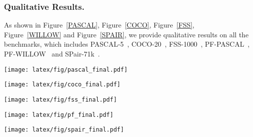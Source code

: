 \subsubsection{Qualitative Results.}
As shown in Figure~\ref{PASCAL}, Figure~\ref{COCO}, Figure~\ref{FSS}, Figure~\ref{WILLOW} and Figure~\ref{SPAIR}, we provide qualitative results on all the benchmarks, which includes PASCAL-5~\cite{shaban2017one}, COCO-20~\cite{lin2014microsoft}, FSS-1000~\cite{li2020fss}, PF-PASCAL~\cite{ham2017proposal}, PF-WILLOW~\cite{ham2016proposal} and SPair-71k~\cite{min2019spair}.
\newpage



\clearpage



\begin{figure*}[t]
\centering
\texttt{[image: latex/fig/pascal\_final.pdf]}\vspace{-10pt}
\caption{\textbf{Qualitative results on PASCAL-5~\cite{shaban2017one}.}   }
\label{PASCAL}
\end{figure*}
\clearpage
\begin{figure*}[t]
\centering
\texttt{[image: latex/fig/coco\_final.pdf]}\vspace{-10pt}
\caption{\textbf{Qualitative results on COCO-20~\cite{lin2014microsoft}.}   }
\label{COCO}
\end{figure*}
\clearpage
\begin{figure*}[t]
\centering
\texttt{[image: latex/fig/fss\_final.pdf]}\vspace{-10pt}
\caption{\textbf{Qualitative results on FSS-1000~\cite{li2020fss}.}   }
\label{FSS}
\end{figure*}
\clearpage
\begin{figure*}[t]
\centering
\texttt{[image: latex/fig/pf\_final.pdf]}\vspace{-10pt}
\caption{\textbf{Qualitative results on PF-PASCAL~\cite{ham2017proposal} (left) and PF-WILLOW~\cite{ham2016proposal} (right). }   }
\label{WILLOW}
\end{figure*}
\clearpage
\begin{figure*}[t]
\centering
\texttt{[image: latex/fig/spair\_final.pdf]}\vspace{-10pt}
\caption{\textbf{Qualitative results on SPair-71k~\cite{min2019spair}.}   }
\label{SPAIR}
\end{figure*}
\clearpage
\clearpage
